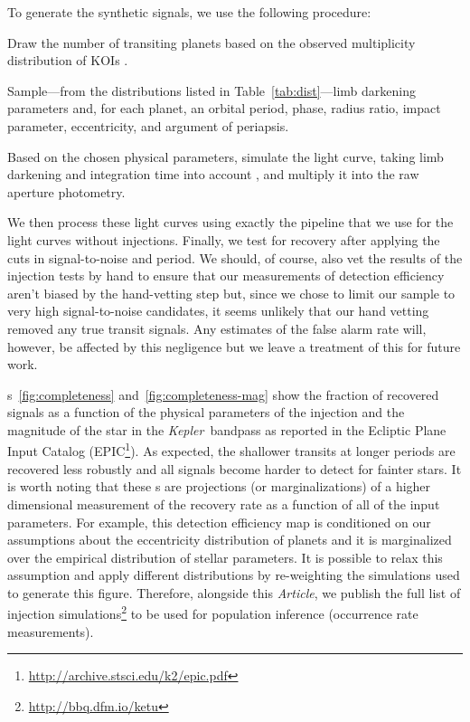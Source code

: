 \documentclass[12pt,preprint]{aastex}
\newcommand{\project}[1]{\textsl{#1}} %
\newcommand{\kepler}{\project{Kepler}}
\newcommand{\paper}{\textsl{Article}}
\newcommand{\figref}[1]{\ref{fig:#1}}
\newcommand{\Tab}[1]{Table~\ref{tab:#1}}
\newcommand{\tab}[1]{\Tab{#1}}
\newcommand{\datareleaseurl}{{\url{http://bbq.dfm.io/ketu}}}
\begin{document}
To generate the synthetic signals, we use the following procedure:
\begin{enumerate}
{\item Draw the number of transiting planets based on the observed
multiplicity distribution of KOIs \citep{kois}.}
{\item Sample---from the distributions listed in
\tab{dist}---limb darkening parameters and, for each planet, an orbital
period, phase, radius ratio, impact parameter, eccentricity, and argument of
periapsis.}
{\item Based on the chosen physical parameters, simulate the light curve,
taking limb darkening and integration time into account \citep{ma,
kipping-int}, and multiply it into the raw aperture photometry.}
\end{enumerate}
We then process these light curves using exactly the pipeline that we use for
the light curves without injections.
Finally, we test for recovery after applying the cuts in signal-to-noise and
period.
We should, of course, also vet the results of the injection tests by hand
to ensure that our measurements of detection efficiency aren't biased by the
hand-vetting
step but, since we chose to limit our sample to very high signal-to-noise
candidates, it seems unlikely that our hand vetting removed any true transit
signals.
Any estimates of the false alarm rate will, however, be affected by this
negligence but we leave a treatment of this for future work.

\figurename s~\figref{completeness} and~\figref{completeness-mag} show the
fraction of recovered signals as a function of the physical parameters of the
injection and the magnitude of the star in the \kepler\ bandpass as reported
in the Ecliptic Plane Input Catalog
(EPIC\footnote{\url{http://archive.stsci.edu/k2/epic.pdf}}).
As expected, the shallower transits at longer periods are recovered less
robustly and all signals become harder to detect for fainter stars.
It is worth noting that these \figurename s are projections (or
marginalizations) of a higher dimensional measurement of the recovery rate as
a function of all of the input parameters.
For example, this detection efficiency map is conditioned on our assumptions
about the eccentricity distribution of planets and it is marginalized over the
empirical distribution of stellar parameters.
It is possible to relax this assumption and apply different distributions by
re-weighting the simulations used to generate this figure.
Therefore, alongside this \paper, we publish the full list of injection
simulations\footnote{\datareleaseurl} to be used for population inference
(occurrence rate measurements).
\end{document}
